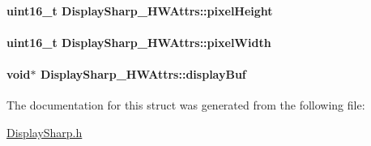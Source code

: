 \paragraph[{pixel\+Height}]{\setlength{\rightskip}{0pt plus 5cm}uint16\+\_\+t Display\+Sharp\+\_\+\+H\+W\+Attrs\+::pixel\+Height}\label{struct_display_sharp___h_w_attrs_a62f62ec53b15da11004d6353721b257c}
\paragraph[{pixel\+Width}]{\setlength{\rightskip}{0pt plus 5cm}uint16\+\_\+t Display\+Sharp\+\_\+\+H\+W\+Attrs\+::pixel\+Width}\label{struct_display_sharp___h_w_attrs_a3ebb52ba808d5698e368af3e5374494d}
\paragraph[{display\+Buf}]{\setlength{\rightskip}{0pt plus 5cm}void$\ast$ Display\+Sharp\+\_\+\+H\+W\+Attrs\+::display\+Buf}\label{struct_display_sharp___h_w_attrs_a6b1656090f48ee01013d9b0e99d5c03d}


The documentation for this struct was generated from the following file\+:\begin{DoxyCompactItemize}
\item 
\hyperlink{_display_sharp_8h}{Display\+Sharp.\+h}\end{DoxyCompactItemize}
